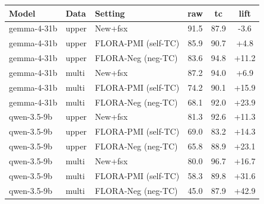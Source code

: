 \begin{tabular}{lll ccc}
\toprule
Model & Data & Setting & raw & tc & lift \\
\midrule
gemma-4-31b & upper & New+fsx & 91.5 & 87.9 & -3.6 \\
gemma-4-31b & upper & FLORA-PMI (self-TC) & 85.9 & 90.7 & +4.8 \\
gemma-4-31b & upper & FLORA-Neg (neg-TC) & 83.6 & 94.8 & +11.2 \\
\midrule
gemma-4-31b & multi & New+fsx & 87.2 & 94.0 & +6.9 \\
gemma-4-31b & multi & FLORA-PMI (self-TC) & 74.2 & 90.1 & +15.9 \\
gemma-4-31b & multi & FLORA-Neg (neg-TC) & 68.1 & 92.0 & +23.9 \\
\midrule
qwen-3.5-9b & upper & New+fsx & 81.3 & 92.6 & +11.3 \\
qwen-3.5-9b & upper & FLORA-PMI (self-TC) & 69.0 & 83.2 & +14.3 \\
qwen-3.5-9b & upper & FLORA-Neg (neg-TC) & 65.8 & 88.9 & +23.1 \\
\midrule
qwen-3.5-9b & multi & New+fsx & 80.0 & 96.7 & +16.7 \\
qwen-3.5-9b & multi & FLORA-PMI (self-TC) & 58.3 & 89.8 & +31.6 \\
qwen-3.5-9b & multi & FLORA-Neg (neg-TC) & 45.0 & 87.9 & +42.9 \\
\bottomrule
\end{tabular}
